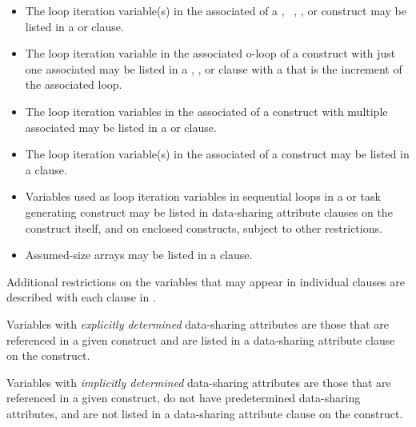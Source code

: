 \begin{fortranspecific}
\begin{itemize}
\item The loop iteration variable(s) in the associated  of a ,
~, , or 
construct may be listed in a  or  clause.

\item The loop iteration variable in the associated o-loop of a  construct with just
one associated  may be listed in a ,
, or  clause with a 
that is the increment of the associated loop.

\item The loop iteration variables in the associated  of a  construct with
multiple associated  may be listed in a  or  clause.

\item The loop iteration variable(s) in the associated  of a 
construct may be listed in a  clause.

\item Variables used as loop iteration variables in sequential loops in a 
or task generating construct may be listed in data-sharing attribute clauses on the construct itself, and on
enclosed constructs, subject to other restrictions.

\item Assumed-size arrays may be listed in a  clause.
\end{itemize}
\end{fortranspecific}

Additional restrictions on the variables that may appear in individual clauses are
described with each clause in .

Variables with \emph{explicitly determined} data-sharing attributes are those that are referenced
in a given construct and are listed in a data-sharing attribute clause on the construct.

Variables with \emph{implicitly determined} data-sharing attributes are those that are referenced
in a given construct, do not have predetermined data-sharing attributes, and are not
listed in a data-sharing attribute clause on the construct.

